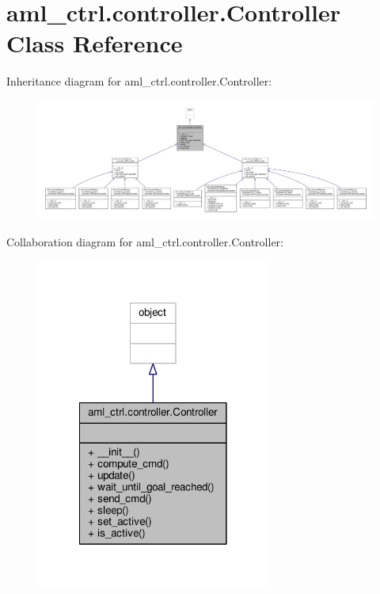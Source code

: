 \hypertarget{classaml__ctrl_1_1controller_1_1_controller}{\section{aml\-\_\-ctrl.\-controller.\-Controller Class Reference}
\label{classaml__ctrl_1_1controller_1_1_controller}
}


Inheritance diagram for aml\-\_\-ctrl.\-controller.\-Controller\-:
\nopagebreak
\begin{figure}[H]
\begin{center}
\leavevmode
\includegraphics[width=350pt]{classaml__ctrl_1_1controller_1_1_controller__inherit__graph}
\end{center}
\end{figure}


Collaboration diagram for aml\-\_\-ctrl.\-controller.\-Controller\-:
\nopagebreak
\begin{figure}[H]
\begin{center}
\leavevmode
\includegraphics[width=218pt]{classaml__ctrl_1_1controller_1_1_controller__coll__graph}
\end{center}
\end{figure}
